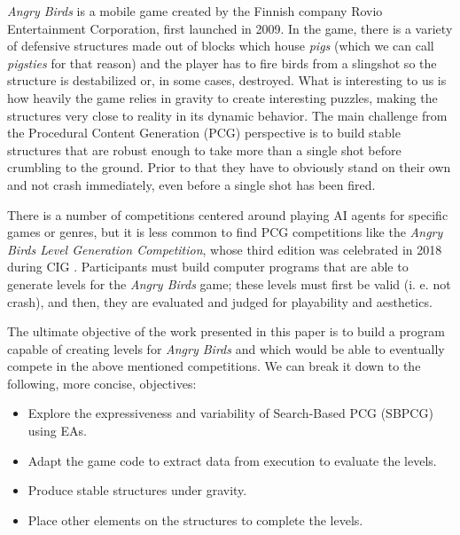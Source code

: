\documentclass[runningheads,a4paper]{llncs}
\begin{document}
\textit{Angry Birds} is a mobile game created by the Finnish company Rovio Entertainment 
Corporation\cite{angry-birds}, first launched in 2009. 
In the game, there is a variety of defensive structures made out of
blocks which house {\em pigs} (which we can call {\em pigsties} for
that reason)
and the player has to fire birds from a slingshot
so the structure is destabilized or, in some cases, destroyed.
What is interesting to us is how heavily the 
game relies in gravity to create interesting puzzles, making the
structures very close to reality in its dynamic behavior. The main challenge 
from 
the Procedural Content Generation (PCG) perspective is to build stable
structures that are robust enough to take more than a single shot
before crumbling to the ground. Prior to that they have to obviously
stand on their own and not crash immediately, even before a single
shot has been fired.

There is a number of competitions centered around playing AI agents for specific 
games or genres, but it is less common to find PCG competitions like the 
\textit{Angry Birds Level Generation Competition}, whose third edition
was celebrated in 2018 during CIG \cite{aibirds}.
Participants must build 
computer programs that are able to generate levels for the \textit{Angry Birds} 
game; these levels must first be valid (i. e. not crash), and then,
they are evaluated and judged for playability and aesthetics. 

The ultimate objective of the work presented in this paper is to
build a program capable of creating levels for \textit{Angry Birds}
and which would be able to eventually compete in the above mentioned
competitions. We can break it down to the following, more concise,
objectives: 

\begin{itemize}
	\item Explore the expressiveness and variability of Search-Based PCG (SBPCG) using  %
	EAs.
	\item Adapt the game code to extract data from execution to 
	evaluate the levels.
	\item Produce stable structures under gravity.
	\item Place other elements on the structures to complete the levels.
\end{itemize} 
\end{document}
